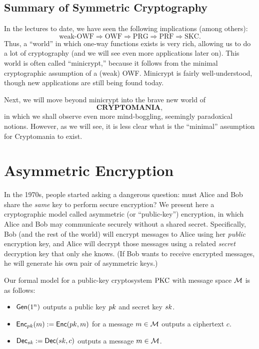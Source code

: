 \documentclass[11pt]{article}
\begin{document}
\subsection{Summary of Symmetric Cryptography}
\label{sec:summ-symm-key}

In the lectures to date, we have seen the following implications
(among others):
\[ \text{weak-OWF} \Rightarrow \text{OWF} \Rightarrow \text{PRG}
\Rightarrow \text{PRF} \Rightarrow \text{SKC}. \] Thus, a ``world'' in
which one-way functions exists is very rich, allowing us to do a lot
of cryptography (and we will see even more applications later on).
This world is often called ``minicrypt,'' because it follows from the
minimal cryptographic assumption of a (weak) OWF.  Minicrypt is fairly
well-understood, though new applications are still being found today.

Next, we will move beyond minicrypt into the brave new world of \[
\textbf{CRYPTOMANIA}, \] in which we shall observe even more
mind-boggling, seemingly paradoxical notions.  However, as we will
see, it is less clear what is the ``minimal'' assumption for
Cryptomania to exist.

\section{Asymmetric Encryption}
\label{sec:asymm-encrypt}

In the 1970s, people started asking a dangerous question: must Alice
and Bob share the \emph{same} key to perform secure encryption?  We
present here a cryptographic model called asymmetric (or
``public-key'') encryption, in which Alice and Bob may communicate
securely without a shared secret.  Specifically, Bob (and the rest of
the world) will encrypt messages to Alice using her \emph{public}
encryption key, and Alice will decrypt those messages using a related
\emph{secret} decryption key that only she knows.  (If Bob wants to
receive encrypted messages, he will generate his own pair of
asymmetric keys.)

Our formal model for a public-key cryptosystem $\text{PKC}$ with message
space $\mathcal{M}$ is as follows:
\begin{itemize}
\item $\mathsf{Gen}(1^{n})$ outputs a public key $pk$ and secret key
  $sk$.
\item $\mathsf{Enc}_{pk}(m) := \mathsf{Enc}(pk, m)$ for a message $m \in
  \mathcal{M}$ outputs a ciphertext $c$.
\item $\mathsf{Dec}_{sk} := \mathsf{Dec}(sk, c)$ outputs a message $m \in
  \mathcal{M}$.
\end{itemize}
\end{document}
